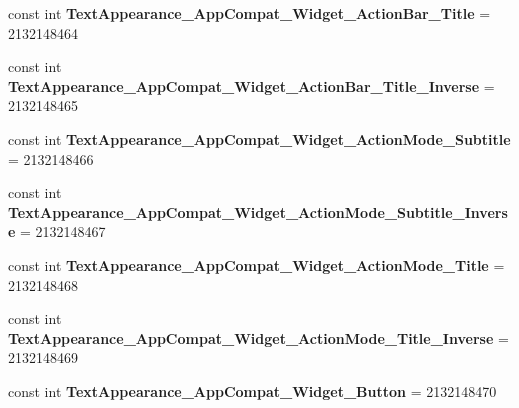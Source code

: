 \begin{DoxyCompactItemize}
\item 
\mbox{\label{classst_delivery_1_1_resource_1_1_style_a1e4655e6f616893b0143f9f3b59fb74a}} 
const int {\bfseries Text\+Appearance\+\_\+\+App\+Compat\+\_\+\+Widget\+\_\+\+Action\+Bar\+\_\+\+Title} = 2132148464
\item 
\mbox{\label{classst_delivery_1_1_resource_1_1_style_a7e07c3856d474786ac03d7e393223553}} 
const int {\bfseries Text\+Appearance\+\_\+\+App\+Compat\+\_\+\+Widget\+\_\+\+Action\+Bar\+\_\+\+Title\+\_\+\+Inverse} = 2132148465
\item 
\mbox{\label{classst_delivery_1_1_resource_1_1_style_afc09c3d67a2bc5aa97fb7a4d7e2f484f}} 
const int {\bfseries Text\+Appearance\+\_\+\+App\+Compat\+\_\+\+Widget\+\_\+\+Action\+Mode\+\_\+\+Subtitle} = 2132148466
\item 
\mbox{\label{classst_delivery_1_1_resource_1_1_style_a6a60db8e28f0215f067f49eba6539a2b}} 
const int {\bfseries Text\+Appearance\+\_\+\+App\+Compat\+\_\+\+Widget\+\_\+\+Action\+Mode\+\_\+\+Subtitle\+\_\+\+Inverse} = 2132148467
\item 
\mbox{\label{classst_delivery_1_1_resource_1_1_style_a71db3eb67b7159191ad64cd471d21ffb}} 
const int {\bfseries Text\+Appearance\+\_\+\+App\+Compat\+\_\+\+Widget\+\_\+\+Action\+Mode\+\_\+\+Title} = 2132148468
\item 
\mbox{\label{classst_delivery_1_1_resource_1_1_style_a0279eee366ada542776d8eba93e2009f}} 
const int {\bfseries Text\+Appearance\+\_\+\+App\+Compat\+\_\+\+Widget\+\_\+\+Action\+Mode\+\_\+\+Title\+\_\+\+Inverse} = 2132148469
\item 
\mbox{\label{classst_delivery_1_1_resource_1_1_style_a53522537775071f5492dc38bdb8f8b1c}} 
const int {\bfseries Text\+Appearance\+\_\+\+App\+Compat\+\_\+\+Widget\+\_\+\+Button} = 2132148470
\item 
\mbox{\label{classst_delivery_1_1_resource_1_1_style_a6db7c969e06a8997b61be050621e2341}} 

\end{DoxyCompactItemize}

